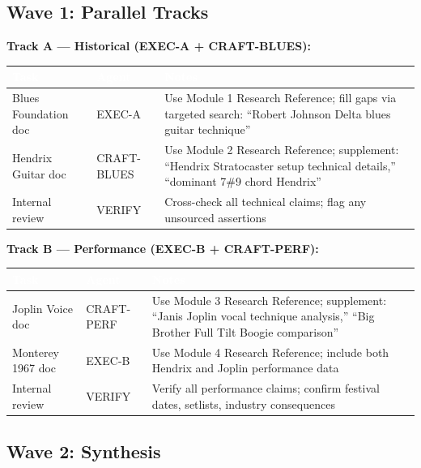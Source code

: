\documentclass[11pt,letterpaper]{article}
\newcommand{\tableheader}[1]{\textbf{\sffamily\textcolor{white}{#1}}}
\begin{document}
\subsection{Wave 1: Parallel Tracks}

\textbf{Track A --- Historical (EXEC-A + CRAFT-BLUES):}

\begin{center}
\begin{tabularx}{\textwidth}{L{3cm}L{2cm}X}
\toprule
{}
\tableheader{Task} & \tableheader{Agent} & \tableheader{Notes} \\
\midrule
Blues Foundation doc & EXEC-A & Use Module 1 Research Reference; fill gaps via targeted search: ``Robert Johnson Delta blues guitar technique'' \\
Hendrix Guitar doc & CRAFT-BLUES & Use Module 2 Research Reference; supplement: ``Hendrix Stratocaster setup technical details,'' ``dominant 7\#9 chord Hendrix'' \\
Internal review & VERIFY & Cross-check all technical claims; flag any unsourced assertions \\
\bottomrule
\end{tabularx}
\end{center}

\textbf{Track B --- Performance (EXEC-B + CRAFT-PERF):}

\begin{center}
\begin{tabularx}{\textwidth}{L{3cm}L{2cm}X}
\toprule
{}
\tableheader{Task} & \tableheader{Agent} & \tableheader{Notes} \\
\midrule
Joplin Voice doc & CRAFT-PERF & Use Module 3 Research Reference; supplement: ``Janis Joplin vocal technique analysis,'' ``Big Brother Full Tilt Boogie comparison'' \\
Monterey 1967 doc & EXEC-B & Use Module 4 Research Reference; include both Hendrix and Joplin performance data \\
Internal review & VERIFY & Verify all performance claims; confirm festival dates, setlists, industry consequences \\
\bottomrule
\end{tabularx}
\end{center}

\subsection{Wave 2: Synthesis}
\end{document}
